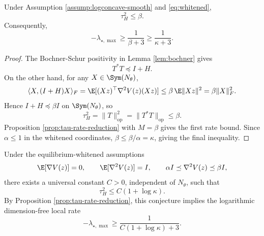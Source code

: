 \begin{proposition}\label{prop:baseline-tau-bound}
    Under Assumption \ref{assump:logconcave-smooth} and \eqref{eq:whitened},
    \begin{equation*}
        \tau_H^2\leq \beta.
    \end{equation*}
    Consequently,
    \begin{equation*}
        -\lambda_{\star,\max}
        \geq
        \frac{1}{\beta+3}
        \geq
        \frac{1}{\kappa+3}.
    \end{equation*}
\end{proposition}

\begin{proof}
    The Bochner-Schur positivity in Lemma \ref{lem:bochner} gives
    \begin{equation*}
        T^*T\preceq I+H.
    \end{equation*}
    On the other hand, for any $X\in\Sym(N_\theta)$,
    \begin{equation*}
        \langle X,(I+H)X\rangle_F
        =
        \E[(Xz)^\top \nabla^2V(z)(Xz)]
        \leq
        \beta\,\E\|Xz\|^2
        =
        \beta\|X\|_F^2.
    \end{equation*}
    Hence $I+H\preceq \beta I$ on $\Sym(N_\theta)$, so
    \begin{equation*}
        \tau_H^2
        =
        \|T\|_{\mathrm{op}}^2
        =
        \|T^*T\|_{\mathrm{op}}
        \leq
        \beta.
    \end{equation*}
    Proposition \ref{prop:tau-rate-reduction} with $M=\beta$ gives the first rate bound. Since $\alpha\leq 1$ in the whitened coordinates, $\beta\leq \beta/\alpha=\kappa$, giving the final inequality.
\end{proof}

\begin{conjecture}\label{conj:tau-H}
    Under the equilibrium-whitened assumptions
    \begin{equation*}
        \E[\nabla V(z)]=0,
        \qquad
        \E[\nabla^2 V(z)]=I,
        \qquad
        \alpha I\preceq \nabla^2 V(z)\preceq \beta I,
    \end{equation*}
    there exists a universal constant $C>0$, independent of $N_\theta$, such that
    \begin{equation*}
        \tau_H^2
        \leq
        C(1+\log\kappa).
    \end{equation*}
    By Proposition \ref{prop:tau-rate-reduction}, this conjecture implies the logarithmic dimension-free local rate
    \begin{equation*}
        -\lambda_{\star,\max}
        \geq
        \frac{1}{C(1+\log\kappa)+3}.
    \end{equation*}
\end{conjecture}
